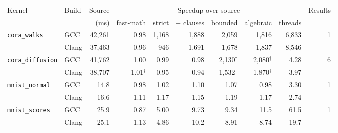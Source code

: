 \begin{tabular}{llrrrrrrrr}
\toprule
Kernel & Build & Source & \multicolumn{6}{c}{Speedup over source} & Results\\
\cmidrule(lr){4-9}
 & & (ms) & fast-math & strict & + clauses & bounded & algebraic & threads & \\
\midrule
\texttt{cora\_walks} & GCC & 42,261 & 0.98 & 1,168 & 1,888 & 2,059 & 1,816 & 6,833 & 1\\
 & Clang & 37,463 & 0.96 & 946 & 1,691 & 1,678 & 1,837 & 8,546 & \\
\addlinespace
\texttt{cora\_diffusion} & GCC & 41,762 & 1.00 & 0.99 & 0.98 & 2,130$^\dagger$ & 2,080$^\dagger$ & 4.28 & 6\\
 & Clang & 38,707 & 1.01$^\dagger$ & 0.95 & 0.94 & 1,532$^\dagger$ & 1,870$^\dagger$ & 3.97 & \\
\addlinespace
\texttt{mnist\_normal} & GCC & 14.8 & 0.98 & 1.02 & 1.10 & 1.07 & 0.98 & 3.30 & 1\\
 & Clang & 16.6 & 1.11 & 1.17 & 1.15 & 1.19 & 1.17 & 2.74 & \\
\addlinespace
\texttt{mnist\_scores} & GCC & 25.9 & 0.87 & 5.00 & 9.73 & 9.34 & 11.5 & 61.5 & 1\\
 & Clang & 25.1 & 1.13 & 4.86 & 10.2 & 8.91 & 8.74 & 19.7 & \\
\bottomrule
\end{tabular}
